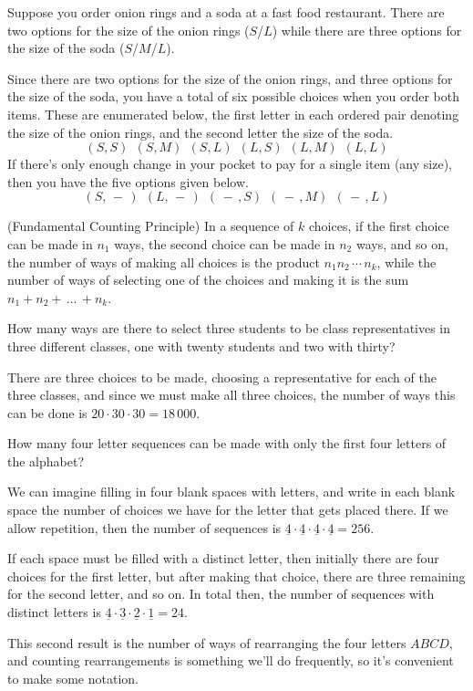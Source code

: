 Suppose you order onion rings and a soda at a fast food restaurant. There are two options for the size of the onion rings ($S$/$L$) while there are three options for the size of the soda ($S$/$M$/$L$).
\par
Since there are two options for the size of the onion rings, and three options for the size of the soda, you have a total of six possible choices when you order both items. These are enumerated below, the first letter in each ordered pair denoting the size of the onion rings, and the second letter the size of the soda.
$$(S,S)\ \ (S,M)\ \ (S,L)\ \ (L,S)\ \ (L,M)\ \ (L,L)$$
\indent If there's only enough change in your pocket to pay for a single item (any size), then you have the five options given below.
$$(S, \, - \, )\ \ (L, \, - \, )\ \ (\, - \, , S) \ \ (\, - \, , M) \ \ (\, - \, , L)$$
\par
\begin{prop}(Fundamental Counting Principle) \label{FundamentalCountingPrinciple} In a sequence of $k$ choices, if the first choice can be made in $n_1$ ways, the second choice can be made in $n_2$ ways, and so on, the number of ways of making all choices is the product $n_1 n_2 \,\cdots\, n_k$, while the number of ways of selecting one of the choices and making it is the sum $n_1 + n_2 + \,\dots\, + n_k$.
\end{prop}
\begin{examp}
How many ways are there to select three students to be class representatives in three different classes, one with twenty students and two with thirty?
\par
\noindent There are three choices to be made, choosing a representative for each of the three classes, and since we must make all three choices, the number of ways this can be done is $20 \cdot 30 \cdot 30 = 18\,000$.\end{examp}
\begin{examp}
How many four letter sequences can be made with only the first four letters of the alphabet?
\par
\noindent We can imagine filling in four blank spaces with letters, and write in each blank space the number of choices we have for the letter that gets placed there. If we allow repetition, then the number of sequences is $\underline{4} \cdot \underline{4} \cdot \underline{4} \cdot \underline{4} = 256$.
\par
\noindent If each space must be filled with a distinct letter, then initially there are four choices for the first letter, but after making that choice, there are three remaining for the second letter, and so on. In total then, the number of sequences with distinct letters is $\underline{4} \cdot \underline{3} \cdot \underline{2} \cdot \underline{1} = 24$. 
\par
\noindent This second result is the number of ways of rearranging the four letters $ABCD$, and counting rearrangements is something we'll do frequently, so it's convenient to make some notation.
\end{examp}
